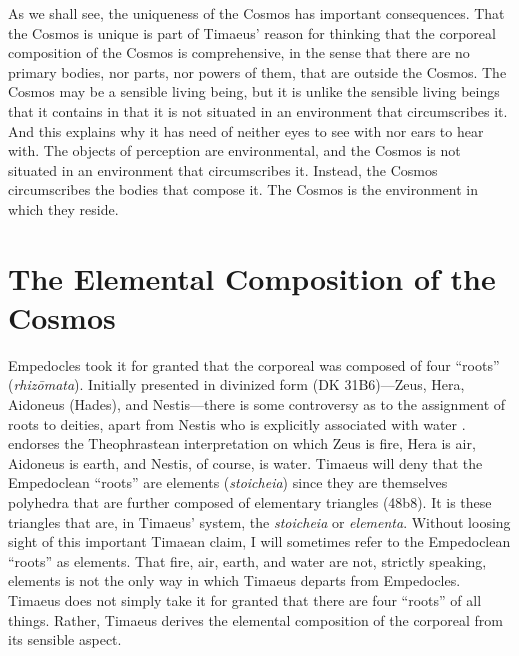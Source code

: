 As we shall see, the uniqueness of the Cosmos has important consequences. That the Cosmos is unique is part of Timaeus' reason for thinking that the corporeal composition of the Cosmos is comprehensive, in the sense that there are no primary bodies, nor parts, nor powers of them, that are outside the Cosmos. The Cosmos may be a sensible living being, but it is unlike the sensible living beings that it contains in that it is not situated in an environment that circumscribes it. And this explains why it has need of neither eyes to see with nor ears to hear with. The objects of perception are environmental, and the Cosmos is not situated in an environment that circumscribes it. Instead, the Cosmos circumscribes the bodies that compose it. The Cosmos is the environment in which they reside.



\section{The Elemental Composition of the Cosmos} %
\label{sec:the_elemental_composition_of_the_corporeal}

Empedocles took it for granted that the corporeal was composed of four ``roots'' (\emph{rhi\-zō\-ma\-ta}). Initially presented in divinized form (DK 31B6)---Zeus, Hera, Aidoneus (Hades), and Nestis---there is some controversy as to the assignment of roots to deities, apart from Nestis who is explicitly associated with water \citep[165--6]{Wright:1981zr}. \citet[165]{Wright:1981zr} endorses the Theophrastean interpretation on which Zeus is fire, Hera is air, Aidon\-eus is earth, and Nestis, of course, is water. Timaeus will deny that the Empedoclean ``roots'' are elements (\emph{stoicheia}) since they are themselves polyhedra that are further composed of elementary triangles (48b8). It is these triangles that are, in Timaeus' system, the \emph{stoicheia} or \emph{elementa}. Without loosing sight of this important Timaean claim, I will sometimes refer to the Empedoclean ``roots'' as elements. That fire, air, earth, and water are not, strictly speaking, elements is not the only way in which Timaeus departs from Empedocles. Timaeus does not simply take it for granted that there are four ``roots'' of all things. Rather, Timaeus derives the elemental composition of the corporeal from its sensible aspect.

